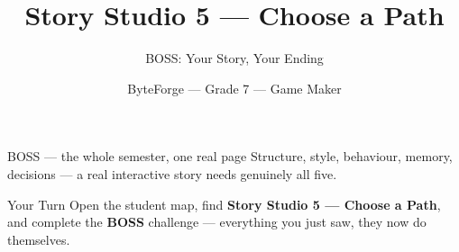 \documentclass[aspectratio=169]{beamer}
\title{Story Studio 5 — Choose a Path}
\subtitle{BOSS: Your Story, Your Ending}
\author{ByteForge --- Grade 7 --- Game Maker}
\date{}
\begin{document}
\begin{frame}
    \titlepage
\end{frame}

\begin{frame}{BOSS — the whole semester, one real page}
    \Large
    Structure, style, behaviour, memory, decisions — a real interactive story needs genuinely all five.
\end{frame}

\begin{frame}{Your Turn}
    \Large
    Open the student map, find \textbf{Story Studio 5 — Choose a Path}, and complete
    the \textbf{BOSS} challenge --- everything you just saw, they now do themselves.
\end{frame}
\end{document}
